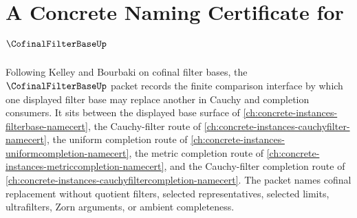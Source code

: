 \chapter{A Concrete Naming Certificate for $\CofinalFilterBaseUp$}
\label{ch:concrete-instances-cofinal-filter-base-namecert}

Following Kelley and Bourbaki on cofinal filter bases, the $\CofinalFilterBaseUp$ packet records the finite comparison interface by which one displayed filter base may replace another in Cauchy and completion consumers. It sits between the displayed base surface of \autoref{ch:concrete-instances-filterbase-namecert}, the Cauchy-filter route of \autoref{ch:concrete-instances-cauchyfilter-namecert}, the uniform completion route of \autoref{ch:concrete-instances-uniformcompletion-namecert}, the metric completion route of \autoref{ch:concrete-instances-metriccompletion-namecert}, and the Cauchy-filter completion route of \autoref{ch:concrete-instances-cauchyfiltercompletion-namecert}. The packet names cofinal replacement without quotient filters, selected representatives, selected limits, ultrafilters, Zorn arguments, or ambient completeness.

